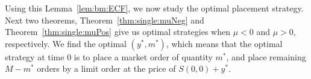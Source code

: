 \documentclass[11pt]{article}
\theoremstyle{plain}
\numberwithin{equation}{section}
\newcommand{\Blue}{\color{Blue}}
\begin{document}
{{%
%
%
%
%
%
%


{
Using this Lemma~\ref{lem:bm:ECF}, we now study the optimal placement strategy.
Next two theorems, Theorem~\ref{thm:single:muNeg} and Theorem~\ref{thm:single:muPos} give us optimal strategies when $\mu<0$ and $\mu>0$, respectively. We find the optimal $(y^*,m^*)$, which means that the optimal strategy at time $0$ is to place a market order of quantity $m^*$, and place remaining $M-m^*$ orders by a limit order at the price of $S(0,0)+y^*$. 
}


}}
\end{document}
